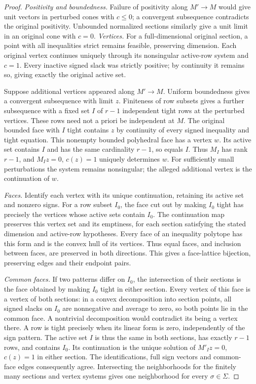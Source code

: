 \documentclass[11pt]{article}
\theoremstyle{remark}
\begin{document}
\begin{proof}
\emph{Positivity and boundedness.} Failure of positivity along $M'\to M$ would give unit vectors in
perturbed cones with $c\le0$; a convergent subsequence contradicts the
original positivity. Unbounded normalized sections similarly give a unit
limit in an original cone with $c=0$.
\emph{Vertices.} For a full-dimensional original section, a point with all inequalities
strict remains feasible, preserving dimension. Each original vertex continues uniquely through its nonsingular
active-row system and $c=1$. Every inactive signed slack was strictly
positive; by continuity it remains so, giving exactly the original active set.

Suppose additional vertices appeared along $M'\to M$. Uniform boundedness
gives a convergent subsequence with limit $z$. Finiteness of row
subsets gives a further subsequence with a fixed set $I$ of $r-1$
independent tight rows at the perturbed vertices. These rows need not
a priori be independent at $M$. The original bounded face with $I$
tight contains $z$ by continuity of every signed inequality and tight
equation. This nonempty bounded polyhedral face has a vertex $w$.
Its active set contains $I$ and has the same cardinality $r-1$, so equals $I$. Thus $M_I$ has rank
$r-1$, and $M_Iz=0$, $c(z)=1$ uniquely determines $w$.
For sufficiently small perturbations the system remains nonsingular;
the alleged additional vertex is the continuation of $w$.

\emph{Faces.} Identify each vertex with its unique continuation, retaining its active
set and nonzero signs. For a row subset $I_0$, the face cut out by making
$I_0$ tight has precisely the vertices whose active sets contain $I_0$.
The continuation map preserves this vertex set and its emptiness,
for each section satisfying the stated dimension and active-row hypotheses.
Every face of an inequality polytope has this form and is the convex hull
of its vertices. Thus equal faces, and inclusion between faces, are
preserved in both directions. This gives a face-lattice bijection,
preserving edges and their endpoint pairs.

\emph{Common faces.} If two patterns differ on $I_0$, the intersection of their sections is
the face obtained by making $I_0$ tight in either section. Every vertex of this face is a vertex of both sections: in a convex
decomposition into section points, all signed slacks on $I_0$ are nonnegative
and average to zero, so both points lie in the common face. A nontrivial
decomposition would contradict its being a vertex there.
A row is tight precisely
when its linear form is zero, independently of the sign pattern.
The active set $I$ is thus the same in both sections, has exactly
$r-1$ rows, and contains $I_0$. Its continuation is the unique
solution of $M'_Iz=0$, $c(z)=1$ in either section. The identifications,
full sign vectors and common-face edges consequently agree.
Intersecting the neighborhoods for the finitely many sections and vertex
systems gives one neighborhood for every $\sigma\in\Sigma$.
\end{proof}
\end{document}
